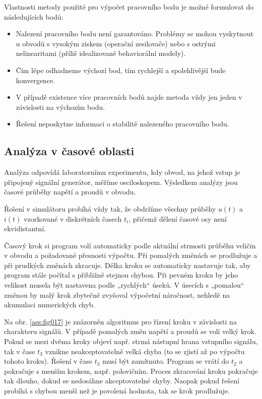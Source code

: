       \begin{tcnote}
        Vlastnosti metody použité pro výpočet pracovního bodu je možné formulovat do následujících
        bodů:
        \begin{itemize}[noitemsep]
          \item Nalezení pracovního bodu není garantováno. Problémy se mohou vyskytnout u obvodů s
                vysokým ziskem (operační zesilovače) nebo s ostrými nelinearitami (příliš
                idealizované behaviorální modely).
          \item Čím lépe odhadneme výchozí bod, tím rychlejší a spolehlivější bude konvergence. 
          \item V případě existence více pracovních bodů najde metoda vždy jen jeden v závislosti
                na výchozím bodu. 
          \item Řešení neposkytne informaci o stabilitě nalezeného pracovního bodu.
        \end{itemize}
      \end{tcnote}

    \subsection{Analýza v časové oblasti}
      Analýza odpovídá laboratornímu experimentu, kdy obvod, na jehož vstup je připojený signální
      generátor, měříme osciloskopem. Výsledkem analýzy jsou časové průběhy napětí a proudů v
      obvodu.


      Řešení v simulátoru probíhá vždy tak, že obdržíme všechny průběhy \(u(t)\) a \(i(t)\)
      vzorkované v diskrétních časech \(t_i\), přičemž dělení časové osy není ekvidistantní.

      Časový krok si program volí automaticky podle aktuální strmosti průběhu veličin v obvodu a
      požadované přesnosti výpočtu. Při pomalých změnách se prodlužuje a při prudkých změnách
      zkracuje. Délka kroku se automaticky nastavuje tak, aby program stále počítal s přibližně
      stejnou chybou. Při pevném kroku by jeho velikost musela být nastavena podle „rychlých“ úseků.
      V úsecích s „pomalou“ změnou by malý krok zbytečně zvyšoval výpočetní náročnost, nehledě na
      akumulaci numerických chyb.

      Na obr. \ref{aes:fig017} je znázorněn algoritmus pro řízení kroku v závislosti na charakteru
      signálů. V případě pomalých změn napětí a proudů se volí velký krok. Pokud se mezi dvěma kroky
      objeví např. strmá nástupní hrana vstupního signálu, tak v čase \(t_3\) vznikne
      neakceptovatelně velká chyba (to se zjistí až po výpočtu tohoto kroku). Řešení v čase \(t_3\)
      musí být zamítnuto. Program se vrátí do \(t_2\) a pokračuje s menším krokem, např. polovičním.
      Proces zkracování kroku pokračuje tak dlouho, dokud se nedosáhne akceptovatelné chyby. Naopak
      pokud řešení probíhá s chybou menší než je povolená hodnota, tak se krok prodlužuje.

